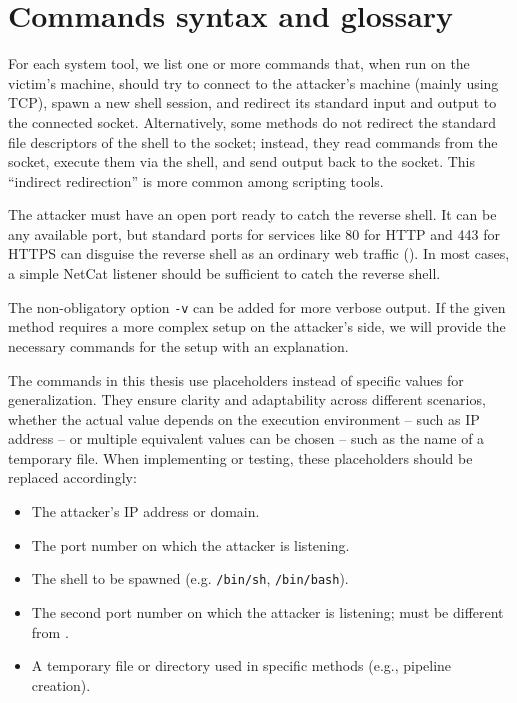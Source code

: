 \section{Commands syntax and glossary}

For each system tool, we list one or more commands that, when run on the victim's machine, should try to connect to the attacker's machine (mainly using TCP), spawn a new shell session, and redirect its standard input and output to the connected socket. Alternatively, some methods do not redirect the standard file descriptors of the shell to the socket; instead, they read commands from the socket, execute them via the shell, and send output back to the socket. This ``indirect redirection'' is more common among scripting tools.

The attacker must have an open port ready to catch the reverse shell. It can be any available port, but standard ports for services like 80 for HTTP and 443 for HTTPS can disguise the reverse shell as an ordinary web traffic (). In most cases, a simple NetCat listener should be sufficient to catch the reverse shell.


The non-obligatory option \texttt{-v} can be added for more verbose output. If the given method requires a more complex setup on the attacker's side, we will provide the necessary commands for the setup with an explanation.

The commands in this thesis use placeholders instead of specific values for generalization. They ensure clarity and adaptability across different scenarios, whether the actual value depends on the execution environment -- such as IP address -- or multiple equivalent values can be chosen -- such as the name of a temporary file. When implementing or testing, these placeholders should be replaced accordingly:

\setlength{\leftmargini}{5em}
\begin{itemize}
\item[\host] The attacker's IP address or domain.
\item[\port] The port number on which the attacker is listening.
\item[\shell] The shell to be spawned (e.g. \texttt{/bin/sh}, \texttt{/bin/bash}).
\item[\portt] The second port number on which the attacker is listening; must be different from \port.
\item[\tmp] A temporary file or directory used in specific methods (e.g., pipeline creation).
\end{itemize}
\setlength{\leftmargini}{2.5em}

